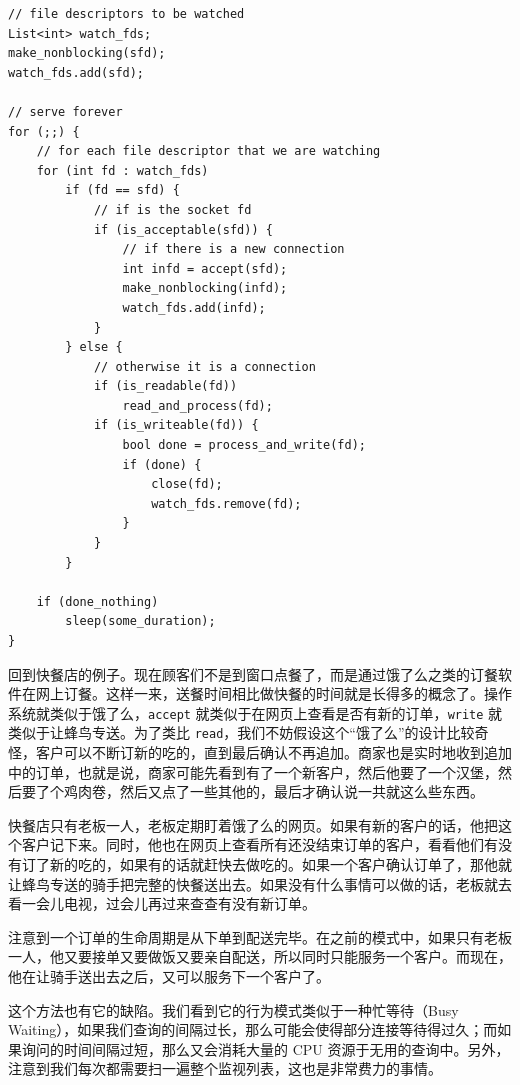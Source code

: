 \documentclass[a4paper]{article}
\begin{document}
\begin{verbatim}
// file descriptors to be watched
List<int> watch_fds;
make_nonblocking(sfd);
watch_fds.add(sfd);

// serve forever
for (;;) {
    // for each file descriptor that we are watching
    for (int fd : watch_fds)
        if (fd == sfd) {
            // if is the socket fd
            if (is_acceptable(sfd)) {
                // if there is a new connection
                int infd = accept(sfd);
                make_nonblocking(infd);
                watch_fds.add(infd);
            }
        } else {
            // otherwise it is a connection
            if (is_readable(fd))
                read_and_process(fd);
            if (is_writeable(fd)) {
                bool done = process_and_write(fd);
                if (done) {
                    close(fd);
                    watch_fds.remove(fd);
                }
            }
        }

    if (done_nothing)
        sleep(some_duration);
}
\end{verbatim}

回到快餐店的例子。现在顾客们不是到窗口点餐了，而是通过饿了么之类的订餐软件在网上订餐。这样一来，送餐时间相比做快餐的时间就是长得多的概念了。操作系统就类似于饿了么，\texttt{accept} 就类似于在网页上查看是否有新的订单，\texttt{write} 就类似于让蜂鸟专送。为了类比 \texttt{read}，我们不妨假设这个``饿了么''的设计比较奇怪，客户可以不断订新的吃的，直到最后确认不再追加。商家也是实时地收到追加中的订单，也就是说，商家可能先看到有了一个新客户，然后他要了一个汉堡，然后要了个鸡肉卷，然后又点了一些其他的，最后才确认说一共就这么些东西。

快餐店只有老板一人，老板定期盯着饿了么的网页。如果有新的客户的话，他把这个客户记下来。同时，他也在网页上查看所有还没结束订单的客户，看看他们有没有订了新的吃的，如果有的话就赶快去做吃的。如果一个客户确认订单了，那他就让蜂鸟专送的骑手把完整的快餐送出去。如果没有什么事情可以做的话，老板就去看一会儿电视，过会儿再过来查查有没有新订单。

注意到一个订单的生命周期是从下单到配送完毕。在之前的模式中，如果只有老板一人，他又要接单又要做饭又要亲自配送，所以同时只能服务一个客户。而现在，他在让骑手送出去之后，又可以服务下一个客户了。

这个方法也有它的缺陷。我们看到它的行为模式类似于一种忙等待（Busy Waiting），如果我们查询的间隔过长，那么可能会使得部分连接等待得过久；而如果询问的时间间隔过短，那么又会消耗大量的 CPU 资源于无用的查询中。另外，注意到我们每次都需要扫一遍整个监视列表，这也是非常费力的事情。
\end{document}
